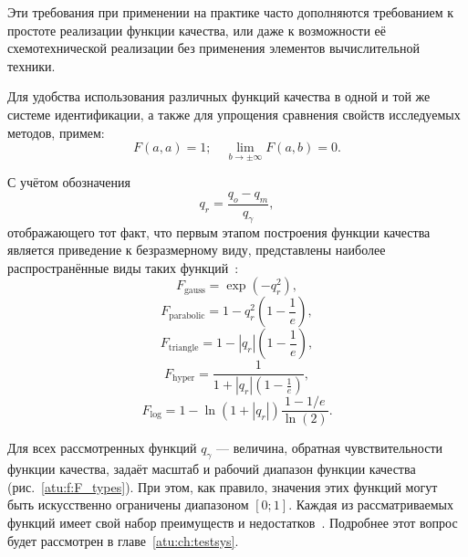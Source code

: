 Эти требования при применении на практике часто дополняются
требованием к простоте реализации функции качества,
или даже к возможности её схемотехнической реализации
без применения элементов вычислительной техники.

Для удобства использования различных функций качества
в одной и той же системе идентификации, а также для
упрощения сравнения свойств исследуемых методов,
примем:
\begin{equation}
  F(a,a) = 1;
  \quad
  \lim\limits_{b \to \pm \infty } F(a,b) = 0.
  \label{atu:eq:F_scale}
\end{equation}




С учётом обозначения
\begin{equation}
  q_r = \frac{q_o - q_m}{q_\gamma},
\label{atu:eq:q_r}
\end{equation}
%
\noindent
отображающего тот факт, что первым этапом построения функции качества
является приведение к безразмерному виду,
представлены наиболее распространённые виды таких функций~\cite{atu_ISDMCI2016}:
%
\begin{equation}
  F_{\mathrm{gauss}} = \exp( - q_r^2 ),
\label{atu:eq:F_gauss}
\end{equation}
%
\begin{equation}
  F_{\mathrm{parabolic}} = 1 - q_r^2 \left( 1 - \frac{1}{e} \right),
\label{atu:eq:F_parabolic}
\end{equation}
%
\begin{equation}
  F_{\mathrm{triangle}} = 1 - |q_r| \left( 1 - \frac{1}{e} \right),
\label{atu:eq:F_triangle}
\end{equation}
%
\begin{equation}
  F_{\mathrm{hyper}} = \frac{1}{ 1 + |q_r| \left( 1 - \frac{1}{e} \right)},
\label{atu:eq:F_hyper}
\end{equation}
%
\begin{equation}
  F_{\mathrm{log}} = 1 - \ln \left( 1 + |q_r| \right) \frac{1-1/e}{\ln(2)}.
\label{atu:eq:F_log}
\end{equation}

Для всех рассмотренных функций $q_\gamma$ --- величина, обратная чувствительности
функции качества, задаёт масштаб и рабочий диапазон функции качества (рис.~\ref{atu:f:F_types}).
При этом, как правило, значения этих функций могут быть искусственно ограничены диапазоном $[0;1]$.
Каждая из рассматриваемых функций имеет свой набор преимуществ и недостатков~\cite{atu_ISDMCI2016}.
Подробнее этот вопрос будет рассмотрен в главе~\ref{atu:ch:testsys}.

